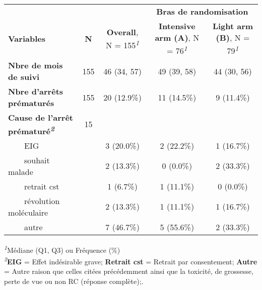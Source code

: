 \setlength{\LTpost}{0mm}
\begin{longtable}{lcccc}
\toprule
 &  &  & \multicolumn{2}{c}{\textbf{Bras de randomisation}} \\ 
\cmidrule(lr){4-5}
\textbf{Variables} & \textbf{N} & \textbf{Overall}, N = 155\textsuperscript{\textit{1}} & \textbf{Intensive arm (A)}, N = 76\textsuperscript{\textit{1}} & \textbf{Light arm (B)}, N = 79\textsuperscript{\textit{1}} \\ 
\midrule\addlinespace[2.5pt]
\textbf{Nbre de mois de suivi} & 155 & 46 (34, 57) & 49 (39, 58) & 44 (30, 56) \\ 
\textbf{Nbre d'arrêts prématurés} & 155 & 20 (12.9\%) & 11 (14.5\%) & 9 (11.4\%) \\ 
\textbf{Cause de l'arrêt prématuré\textsuperscript{\textit{2}}} & 15 &  &  &  \\ 
    EIG &  & 3 (20.0\%) & 2 (22.2\%) & 1 (16.7\%) \\ 
    souhait malade &  & 2 (13.3\%) & 0 (0.0\%) & 2 (33.3\%) \\ 
    retrait cst &  & 1 (6.7\%) & 1 (11.1\%) & 0 (0.0\%) \\ 
    révolution moléculaire &  & 2 (13.3\%) & 1 (11.1\%) & 1 (16.7\%) \\ 
    autre &  & 7 (46.7\%) & 5 (55.6\%) & 2 (33.3\%) \\ 
\bottomrule
\end{longtable}
\begin{minipage}{\linewidth}
\textsuperscript{\textit{1}}Médiane (Q1, Q3) ou Fréquence (\%)\\
\textsuperscript{\textit{2}}\textbf{EIG} = Effet indésirable grave;  \textbf{Retrait cst} = Retrait par consentement; \textbf{Autre} = Autre raison que celles citées précédemment ainsi que la toxicité, de grossesse, perte de vue ou non RC (réponse complète);.\\
\end{minipage}

